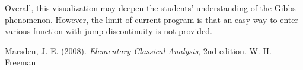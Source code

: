 \documentclass[12pt]{article}
\theoremstyle{definition}
\begin{document}
Overall, this visualization may deepen the students' understanding of the Gibbs phenomenon. However, the limit of current program is that an easy way to enter various function with jump discontinuity is not provided.

\begin{thebibliography}{9}
    Marsden, J. E. (2008).
    \emph{Elementary Classical Analysis}, 2nd edition.
    W. H. Freeman
\end{thebibliography}
\end{document}
